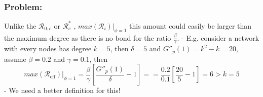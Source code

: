 \documentclass[
]{article}
\begin{document}
\subsubsection{Problem:}\label{problem}

Unlike the \(\mathcal{R}_{0,c}\) or \(\mathcal{R}^*_{c}\) ,
\(max(\mathcal{R}_{i})|_{\phi=1}\) this amount could easily be larger
than the maximum degree as there is no bond for the ratio
\(\frac{\beta}{\gamma}\). - E.g. consider a network with every nodes has
degree \(k=5\), then \(\delta=5\) and \(G''_p(1)=k^2-k=20\), assume
\(\beta=0.2\) and \(\gamma=0.1\), then
\[max(\mathcal{R}_\text{eff})|_{\phi=1}=\frac{\beta}{\gamma}[\frac{G''_p(1)}{\delta}-1]==\frac{0.2}{0.1}[\frac{20}{5}-1]=6>k=5\]
- We need a better definition for this!
\end{document}
